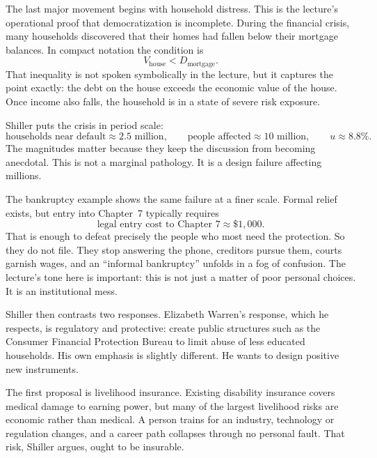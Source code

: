 The last major movement begins with household distress. This is the lecture's operational proof that democratization is incomplete. During the financial crisis, many households discovered that their homes had fallen below their mortgage balances. In compact notation the condition is
\begin{equation}
V_{\text{house}} < D_{\text{mortgage}}.
\end{equation}
That inequality is not spoken symbolically in the lecture, but it captures the point exactly: the debt on the house exceeds the economic value of the house. Once income also falls, the household is in a state of severe risk exposure.

Shiller puts the crisis in period scale:
\begin{equation}
\text{households near default} \approx 2.5 \text{ million},\qquad
\text{people affected} \approx 10 \text{ million},\qquad
u \approx 8.8\%.
\end{equation}
The magnitudes matter because they keep the discussion from becoming anecdotal. This is not a marginal pathology. It is a design failure affecting millions.

The bankruptcy example shows the same failure at a finer scale. Formal relief exists, but entry into Chapter~7 typically requires
\begin{equation}
\text{legal entry cost to Chapter 7} \approx \$1{,}000.
\end{equation}
That is enough to defeat precisely the people who most need the protection. So they do not file. They stop answering the phone, creditors pursue them, courts garnish wages, and an ``informal bankruptcy'' unfolds in a fog of confusion. The lecture's tone here is important: this is not just a matter of poor personal choices. It is an institutional mess.

Shiller then contrasts two responses. Elizabeth Warren's response, which he respects, is regulatory and protective: create public structures such as the Consumer Financial Protection Bureau to limit abuse of less educated households. His own emphasis is slightly different. He wants to design positive new instruments.

The first proposal is livelihood insurance. Existing disability insurance covers medical damage to earning power, but many of the largest livelihood risks are economic rather than medical. A person trains for an industry, technology or regulation changes, and a career path collapses through no personal fault. That risk, Shiller argues, ought to be insurable.

